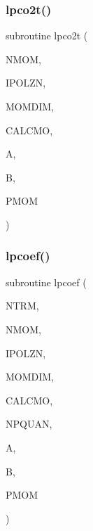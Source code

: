 \mbox{\label{miev0__py_8f_af491bde683b4a07ee245f9c3e53c6894}} 
\subsubsection{\texorpdfstring{lpco2t()}{lpco2t()}}
{\footnotesize\ttfamily subroutine lpco2t (\begin{DoxyParamCaption}\item[{integer}]{N\+M\+OM,  }\item[{integer}]{I\+P\+O\+L\+ZN,  }\item[{integer}]{M\+O\+M\+D\+IM,  }\item[{logical, dimension( $\ast$ )}]{C\+A\+L\+C\+MO,  }\item[{complex, dimension( $\ast$ )}]{A,  }\item[{complex, dimension( $\ast$ )}]{B,  }\item[{real, dimension( 0\+:momdim, $\ast$ )}]{P\+M\+OM }\end{DoxyParamCaption})}

\mbox{\label{miev0__py_8f_a8f1c192fc6a73a6b9e55d5a52de1f201}} 
\subsubsection{\texorpdfstring{lpcoef()}{lpcoef()}}
{\footnotesize\ttfamily subroutine lpcoef (\begin{DoxyParamCaption}\item[{integer}]{N\+T\+RM,  }\item[{integer}]{N\+M\+OM,  }\item[{integer}]{I\+P\+O\+L\+ZN,  }\item[{integer}]{M\+O\+M\+D\+IM,  }\item[{logical, dimension( $\ast$ )}]{C\+A\+L\+C\+MO,  }\item[{integer}]{N\+P\+Q\+U\+AN,  }\item[{complex, dimension( $\ast$ )}]{A,  }\item[{complex, dimension( $\ast$ )}]{B,  }\item[{real, dimension( 0\+:momdim, $\ast$ )}]{P\+M\+OM }\end{DoxyParamCaption})}


